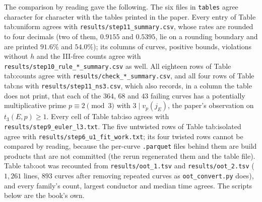 \begin{sloppypar}
\begin{remark}
The comparison by reading gave the following. The six files in \texttt{tables} agree character for character with the tables printed in the paper. Every entry of Table tab:uniform agrees with
\texttt{results/step11\_summary.csv}, whose rates are rounded to four decimals (two of them, $0.9155$ and $0.5395$, lie on a rounding boundary and are printed
$91.6\%$ and $54.0\%$); its columns of curves, positive bounds, violations without $h$ and the III-free counts agree with \texttt{results/step10\_rule\_*\_summary.csv} as well. All eighteen rows of
Table tab:counts agree with \texttt{results/check\_*\_summary.csv}, and all four rows of Table tab:ns with \texttt{results/step11\_ns3.csv}, which also records,
in a column the table does not print, that each of the $364$, $68$ and $43$ failing curves has a potentially multiplicative prime $p\equiv2\pmod3$ with $3\mid v_p(j_E)$,
the paper's observation on $t_3(E,p)\ge1$. Every cell of Table tab:iso agrees with \texttt{results/step9\_euler\_l3.txt}. The five untwisted rows of
Table tab:isolated agree with \texttt{results/step6\_u1\_fit\_work.txt}; its four twisted rows cannot be compared by reading, because the per-curve
\texttt{.parquet} files behind them are build products that are not committed (the rerun regenerated them and the table file). Table tab:oot was recounted from \texttt{results/oot\_1.tsv} and \texttt{results/oot\_2.tsv}
($1{,}261$ lines, $893$ curves after removing repeated curves as \texttt{oot\_convert.py} does), and every family's count, largest conductor and median time
agrees. The scripts below are the book's own.
\end{remark}


\end{sloppypar}
